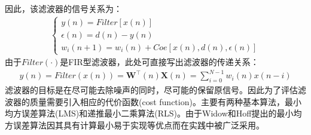 \documentclass{ctexart}
\begin{document}
				因此，该滤波器的信号关系为：
				\begin{gather}
					\begin{cases}
						y(n)=Filter[x(n)]\\
						\epsilon(n)=d(n)-y(n)\\
						w_i(n+1)=w_i(n)+Coe[x(n),d(n),\epsilon(n)]
					\end{cases}
					\label{eq:自适应滤波器原理等式}
				\end{gather}
				由于$Filter(\cdot)$是FIR型滤波器，此处可直接写出滤波器的传递关系：
				\begin{gather}
					y(n)=Filter(x(n))=\bm{W}^\top(n)\bm{X}(n)=\sum_{i=0}^{N-1}w_i(n)x(n-i)
					\label{eq:滤波器传递函数}
				\end{gather}
				滤波器的目标是在尽可能去除噪声的同时，尽可能的保留原信号。因此为了评估滤波器的质量需要引入相应的代价函数(cost function)。主要有两种基本算法，最小均方误差算法(LMS)和递推最小二乘算法(RLS)。由于Widow和Hoff提出的最小均方误差算法因其具有计算最小易于实现等优点而在实践中被广泛采用。\cite{自适应滤波器在噪声对消中的应用}
\end{document}
